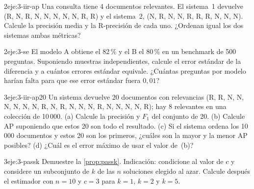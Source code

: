 \begin{ejercicio}{2}{eje:3-iir-ap}
Una consulta tiene 4 documentos relevantes. El sistema~1 devuelve (R, N, R, N, N, N, N, N, R, R) y el sistema~2, (N, R, N, N, R, R, R, N, N, N). Calcule la precisión media y la R-precisión de cada uno. ¿Ordenan igual los dos sistemas ambas métricas?
\end{ejercicio}

\begin{ejercicio}{2}{eje:3-se}
El modelo A obtiene el 82\,\% y el B el 80\,\% en un benchmark de 500 preguntas. Suponiendo muestras independientes, calcule el error estándar de la diferencia y a cuántos errores estándar equivale. ¿Cuántas preguntas por modelo harían falta para que ese error estándar fuera $0{,}01$?
\end{ejercicio}

\begin{ejercicio}{3}{eje:3-iir-ap20}
Un sistema devuelve 20 documentos con relevancias (R, R, N, N, N, N, N, N, R, N, R, N, N, N, R, N, N, N, N, R); hay 8 relevantes en una colección de 10\,000. (a) Calcule la precisión y $F_1$ del conjunto de 20. (b) Calcule AP suponiendo que estos 20 son todo el resultado. (c) Si el sistema ordena los 10\,000 documentos y estos 20 son los primeros, ¿cuáles son la mayor y la menor AP posibles? (d) ¿Cuál es el error máximo de usar el valor de~(b)?
\end{ejercicio}

\begin{ejercicio}{3}{eje:3-passk}
Demuestre la \cref{prop:passk}. Indicación: condicione al valor de $c$ y considere un subconjunto de $k$ de las $n$ soluciones elegido al azar. Calcule después el estimador con $n=10$ y $c=3$ para $k=1$, $k=2$ y $k=5$.
\end{ejercicio}
